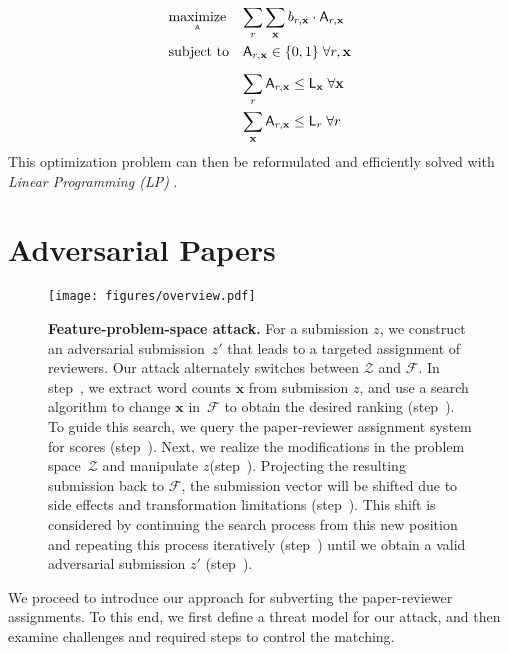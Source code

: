 \documentclass[letterpaper,twocolumn,10pt]{article}
\newcommand{\stepone}{\ding{182}\xspace}
\newcommand{\steptwo}{\ding{183}\xspace}
\newcommand{\stepthree}{\ding{184}\xspace}
\newcommand{\stepfour}{\ding{185}\xspace}
\newcommand{\stepfive}{\ding{186}\xspace}
\newcommand{\stepsix}{\ding{187}\xspace}
\newcommand{\stepseven}{\ding{188}\xspace}
\newcommand{\bow}{\textbf{x}}
\newcommand{\assignment}{\mathsf{A}}
\newcommand{\submission}{\bow}
\newcommand{\reviewer}{r}
\newcommand{\reviewerload}{\mathsf{L}_{\reviewer}}
\newcommand{\paperload}{\mathsf{L}_{\submission}}
\newcommand{\bid}{b}
\newcommand{\Dom}{\ensuremath{\mathcal{Z}}\xspace}
\newcommand{\F}{\ensuremath{\mathcal{F}}\xspace}
\newcommand{\inputpdf}{\ensuremath{z}\xspace}
\begin{document}
\begin{equation*}
\begin{array}{ll@{}ll}
\underset{\scriptscriptstyle \assignment}{\text{maximize}}    & \displaystyle \displaystyle\sum_{\reviewer}\sum_{\submission} \bid_{\reviewer, \submission} \cdot \assignment_{\reviewer, \submission} &\\[3ex]
\text{subject to}   & \assignment_{\reviewer, \submission} \in \{0,1\} \;\forall \reviewer,\submission \\[2ex]
                    & \displaystyle \sum_{\reviewer} \assignment_{\reviewer, \submission} \leq \paperload  \;\forall \submission \\[3ex]
                    & \displaystyle \sum_{\submission} \assignment_{\reviewer, \submission} \leq \reviewerload \;\forall \reviewer \\
                    
\end{array}
\end{equation*}
This optimization problem can then be {reformulated\EndAccSupp{}} and efficiently solved with \emph{Linear Programming (LP)} \cite{taylor-08-optimal}. \section{Adversarial Papers}
\label{sec:approach}
\begin{figure*}[t]
    \centering
\texttt{[image: figures/overview.pdf]}
    \caption{\textbf{Feature-problem-space attack.} For a submission $\inputpdf$, we construct an adversarial submission~$\inputpdf'$ that leads to a targeted assignment of reviewers. Our attack alternately switches between \Dom and \F. In step~\stepone, we extract word counts $\submission$ from submission $\inputpdf$, and use a search algorithm to change $\submission$ in~\F to obtain the desired ranking (step~\steptwo). To guide this search, we query the paper-reviewer assignment system for scores (step~\stepthree). Next, we realize the modifications in the problem space~\Dom and manipulate \inputpdf (step~\stepfour). Projecting the resulting submission back to \F, the submission vector will be shifted due to side effects and transformation limitations (step~\stepfive). This shift is considered by continuing the search process from this new position and repeating this process iteratively (step~\stepsix) until we obtain a valid adversarial submission $\inputpdf'$ (step~\stepseven).}
    \label{fig:overview}
\end{figure*} 
We proceed to introduce our approach for {subverting\EndAccSupp{}} the paper-reviewer assignments. To this end, we first define a threat model for our attack, and then examine challenges and required steps to control the matching.
\end{document}
